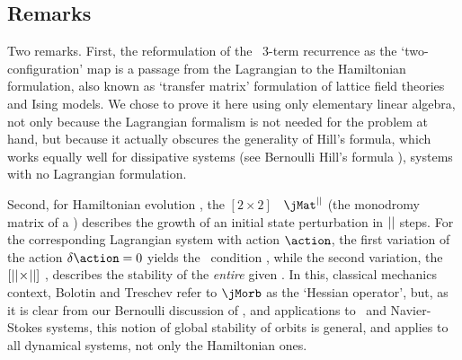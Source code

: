 \subsection{Remarks}
\label{s:LC21HillForm}

Two remarks.
First, the reformulation of the \catlatt\ 3-term recurrence
as the `two-configuration' map  is
a passage from the Lagrangian to the Hamiltonian formulation, also known
as `transfer matrix' formulation of lattice field
theories and Ising
models. We chose to prove it here using only
elementary linear algebra, not only because the Lagrangian
formalism is not needed for the problem at hand, but because
it actually obscures the generality of Hill's formula, which works
equally well for dissipative systems (see Bernoulli Hill's formula
), systems with no Lagrangian formulation.

Second,
for Hamiltonian evolution , the $[2\!\times\!2]$
\jacobianM\ $\jMat^\cl{}$ (the monodromy matrix of a \po) describes
the growth of an initial state perturbation in ${||}$ steps. For the
corresponding Lagrangian system with action $\action$,
the first variation of
the action $\delta\action=0$ yields the \templatt\ condition
, while the second variation, the
$[{||}\!\times\!{||}]$ {\jacobianOrb} ,
describes the stability of the \emph{entire} given \po. In this,
classical mechanics context, Bolotin and Treschev refer to
$\jMorb$ as the `Hessian operator', but, as it is clear from our
Bernoulli discussion of , and applications to \KS\
and Navier-Stokes systems, this notion of global stability
of orbits is general, and applies to all dynamical systems, not only the
Hamiltonian ones.
